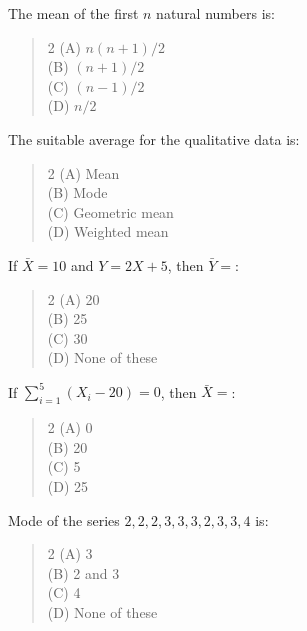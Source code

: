 \documentclass[11pt,a4paper]{article}
\begin{document}
\begin{mcqlist}
\item The mean of the first $n$ natural numbers is:
\begin{quote}\begin{multicols}{2}
\noindent (A) $n(n+1)/2$ \\
(B) $(n+1)/2$ \\
(C) $(n-1)/2$ \\
(D) $n/2$
\end{multicols}\end{quote}

\item The suitable average for the qualitative data is:
\begin{quote}\begin{multicols}{2}
\noindent (A) Mean \\
(B) Mode \\
(C) Geometric mean \\
(D) Weighted mean
\end{multicols}\end{quote}

\item If $\bar{X}=10$ and $Y=2X+5$, then $\bar{Y}=$:
\begin{quote}\begin{multicols}{2}
\noindent (A) 20 \\
(B) 25 \\
(C) 30 \\
(D) None of these
\end{multicols}\end{quote}

\item If $\displaystyle\sum_{i=1}^{5}(X_i-20)=0$, then $\bar{X}=$:
\begin{quote}\begin{multicols}{2}
\noindent (A) 0 \\
(B) 20 \\
(C) 5 \\
(D) 25
\end{multicols}\end{quote}

\item Mode of the series $2,2,2,3,3,3,2,3,3,4$ is:
\begin{quote}\begin{multicols}{2}
\noindent (A) 3 \\
(B) 2 and 3 \\
(C) 4 \\
(D) None of these
\end{multicols}\end{quote}


\end{mcqlist}
\end{document}
